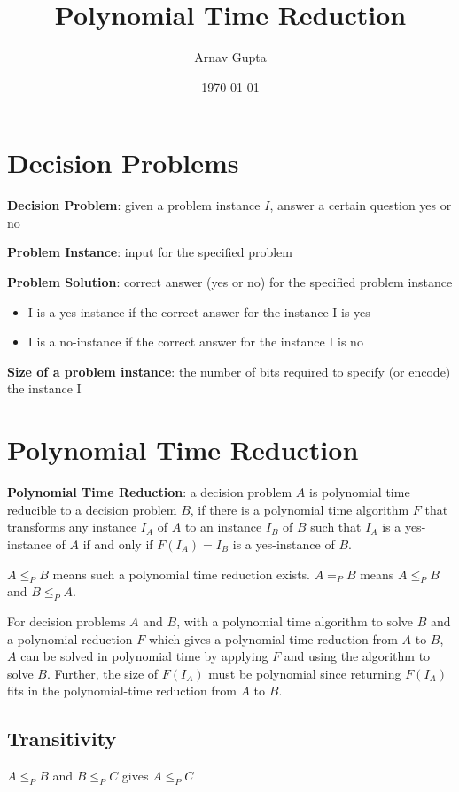 \documentclass[11pt]{article}
\author{Arnav Gupta}
\date{\today}
\title{Polynomial Time Reduction}
\begin{document}
\maketitle
\tableofcontents

\section{Decision Problems}
\label{sec:orga335cf9}
\textbf{Decision Problem}: given a problem instance \(I\), answer a certain question yes or no

\textbf{Problem Instance}: input for the specified problem

\textbf{Problem Solution}: correct answer (yes or no) for the specified problem instance
\begin{itemize}
\item I is a yes-instance if the correct answer for the instance I is yes
\item I is a no-instance if the correct answer for the instance I is no
\end{itemize}

\textbf{Size of a problem instance}: the number of bits required to specify (or encode) the
instance I
\section{Polynomial Time Reduction}
\label{sec:orgafae974}
\textbf{Polynomial Time Reduction}: a decision problem \(A\) is polynomial time reducible to a decision
problem \(B\), if there is a polynomial time algorithm \(F\) that transforms any instance \(I_{A}\)
of \(A\) to an instance \(I_{B}\) of \(B\) such that \(I_{A}\) is a yes-instance of \(A\) if and only if
\(F(I_{A}) = I_{B}\) is a yes-instance of \(B\).

\(A \le_{P} B\) means such a polynomial time reduction exists.
\(A =_{P} B\) means \(A \le_{P} B\) and \(B \le_{P} A\).

For decision problems \(A\) and \(B\), with a polynomial time algorithm to solve \(B\) and a
polynomial reduction \(F\) which gives a polynomial time reduction from \(A\) to \(B\),
\(A\) can be solved in polynomial time by applying \(F\) and using the algorithm to solve \(B\).
Further, the size of \(F(I_{A})\) must be polynomial since returning \(F(I_{A})\) fits in the
polynomial-time reduction from \(A\) to \(B\).
\subsection{Transitivity}
\label{sec:orgca9484e}
\(A \le_{P} B\) and \(B \le_{P} C\) gives \(A \le_{P} C\)
\end{document}
